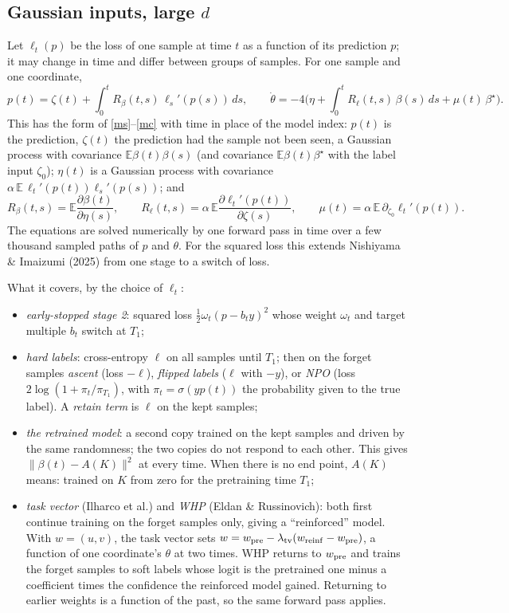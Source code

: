 \documentclass[10pt]{article}
\newcommand{\bs}{\beta^\star}\newcommand{\E}{\mathbb E}\newcommand{\asinh}{\operatorname{arcsinh}}\newcommand{\prox}{\operatorname{prox}}
\begin{document}
\subsection{Gaussian inputs, large $d$}\label{dyn}
Let $\ell_t(p)$ be the loss of one sample at time $t$ as a function of its prediction $p$; it may change in time and differ between groups of samples. For one sample and one coordinate,
\begin{equation}\label{nl}
p(t)=\zeta(t)+\int_0^tR_\beta(t,s)\,\ell_s'(p(s))\,ds,\qquad
\dot\theta=-4\Big(\eta+\int_0^tR_\ell(t,s)\,\beta(s)\,ds+\mu(t)\,\bs\Big).
\end{equation}
This has the form of \eqref{ms}--\eqref{mc} with time in place of the model index: $p(t)$ is the prediction, $\zeta(t)$ the prediction had the sample not been seen, a Gaussian process with covariance $\E\beta(t)\beta(s)$ (and covariance $\E\beta(t)\bs$ with the label input $\zeta_0$); $\eta(t)$ is a Gaussian process with covariance $\alpha\,\E\,\ell_t'(p(t))\ell_s'(p(s))$; and
\[
R_\beta(t,s)=\E\frac{\partial\beta(t)}{\partial\eta(s)},\qquad R_\ell(t,s)=\alpha\,\E\frac{\partial\ell_t'(p(t))}{\partial\zeta(s)},\qquad\mu(t)=\alpha\,\E\,\partial_{\zeta_0}\ell_t'(p(t)).
\]
The equations are solved numerically by one forward pass in time over a few thousand sampled paths of $p$ and $\theta$. For the squared loss this extends Nishiyama \& Imaizumi (2025) from one stage to a switch of loss.

What it covers, by the choice of $\ell_t$:
\begin{itemize}[nosep,leftmargin=1.2em]
\item \emph{early-stopped stage 2}: squared loss $\frac12\omega_t(p-b_ty)^2$ whose weight $\omega_t$ and target multiple $b_t$ switch at $T_1$;
\item \emph{hard labels}: cross-entropy $\ell$ on all samples until $T_1$; then on the forget samples \emph{ascent} (loss $-\ell$), \emph{flipped labels} ($\ell$ with $-y$), or \emph{NPO} (loss $2\log(1+\pi_t/\pi_{T_1})$, with $\pi_t=\sigma(yp(t))$ the probability given to the true label). A \emph{retain term} is $\ell$ on the kept samples;
\item \emph{the retrained model}: a second copy trained on the kept samples and driven by the same randomness; the two copies do not respond to each other. This gives $\|\beta(t)-A(K)\|^2$ at every time. When there is no end point, $A(K)$ means: trained on $K$ from zero for the pretraining time $T_1$;
\item \emph{task vector} (Ilharco et al.) and \emph{WHP} (Eldan \& Russinovich): both first continue training on the forget samples only, giving a ``reinforced'' model. With $w=(u,v)$, the task vector sets $w=w_{\rm pre}-\lambda_{\rm tv}(w_{\rm reinf}-w_{\rm pre})$, a function of one coordinate's $\theta$ at two times. WHP returns to $w_{\rm pre}$ and trains the forget samples to soft labels whose logit is the pretrained one minus a coefficient times the confidence the reinforced model gained. Returning to earlier weights is a function of the past, so the same forward pass applies.
\end{itemize}
\end{document}
